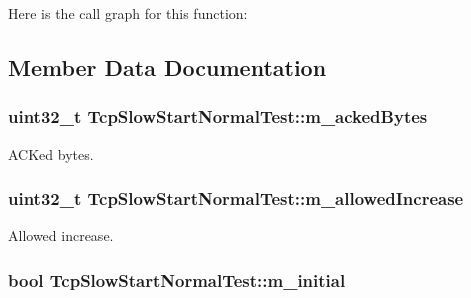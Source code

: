Here is the call graph for this function\+:




\subsection{Member Data Documentation}
\subsubsection[{\texorpdfstring{m\+\_\+acked\+Bytes}{m_ackedBytes}}]{\setlength{\rightskip}{0pt plus 5cm}uint32\+\_\+t Tcp\+Slow\+Start\+Normal\+Test\+::m\+\_\+acked\+Bytes\hspace{0.3cm}{\ttfamily [protected]}}\hypertarget{classTcpSlowStartNormalTest_a600d8138b3928e08220753e932184aaf}{}\label{classTcpSlowStartNormalTest_a600d8138b3928e08220753e932184aaf}


A\+C\+Ked bytes. 

\subsubsection[{\texorpdfstring{m\+\_\+allowed\+Increase}{m_allowedIncrease}}]{\setlength{\rightskip}{0pt plus 5cm}uint32\+\_\+t Tcp\+Slow\+Start\+Normal\+Test\+::m\+\_\+allowed\+Increase\hspace{0.3cm}{\ttfamily [protected]}}\hypertarget{classTcpSlowStartNormalTest_af8e569787001a3fb9d2d3691613cf4f0}{}\label{classTcpSlowStartNormalTest_af8e569787001a3fb9d2d3691613cf4f0}


Allowed increase. 

\subsubsection[{\texorpdfstring{m\+\_\+initial}{m_initial}}]{\setlength{\rightskip}{0pt plus 5cm}bool Tcp\+Slow\+Start\+Normal\+Test\+::m\+\_\+initial\hspace{0.3cm}{\ttfamily [protected]}}\hypertarget{classTcpSlowStartNormalTest_a013ae131e0712980cce8833b6e2271c2}{}\label{classTcpSlowStartNormalTest_a013ae131e0712980cce8833b6e2271c2}


